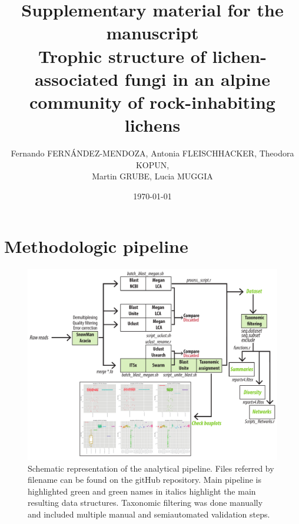 \documentclass[a4paper, 11]{article}\usepackage[]{graphicx}\usepackage[]{color}
\begin{document}
	\title{
	{Supplementary material for the manuscript}\\
	{\large Trophic structure of lichen-associated fungi in an alpine community of rock-inhabiting lichens}\\
	}
\author{Fernando FERNÁNDEZ-MENDOZA, Antonia FLEISCHHACKER, Theodora KOPUN,\\ Martin GRUBE, Lucia MUGGIA}
\date{\today}
\maketitle
\tableofcontents{}
\newpage
\section{Methodologic pipeline}
\begin{figure}[p]
  \centering
    \includegraphics[width=\textwidth]{supplement_fig1.pdf}
  \caption{Schematic representation of the analytical pipeline. Files referred by filename can be found on the gitHub repository. Main pipeline is highlighted green and green names in italics highlight the main resulting data structures. Taxonomic filtering was done manually and included multiple manual and semiautomated validation steps.}
  \label{fig:supplement_fig1}
\end{figure}
\newpage
\end{document}

